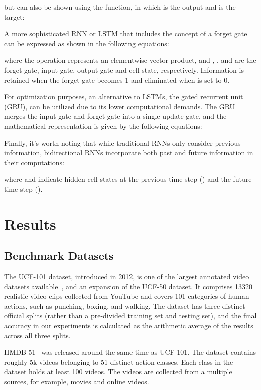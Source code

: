 \documentclass[fleqn,10pt]{wlscirep}
\begin{document}
but can also be shown using the  function, in which  is the output and  is the target:

A more sophisticated RNN or LSTM that includes the concept of a forget gate can be expressed as shown in the following equations:

where the  operation represents an elementwise vector product, and , ,  and  are the forget gate, input gate, output gate and cell state, respectively. Information is retained when the forget gate  becomes 1 and eliminated when  is set to 0.

For optimization purposes, an alternative to LSTMs, the gated recurrent unit (GRU), can be utilized due to its lower computational demands. The GRU merges the input gate and forget gate into a single update gate, and the mathematical representation is given by the following equations:


Finally, it's worth noting that while traditional RNNs only consider previous information, bidirectional RNNs incorporate both past and future information in their computations:

where  and  indicate hidden cell states at the previous time step () and the future time step ().
\section{Results}
\label{sec:results}
\subsection{Benchmark Datasets}
\label{sec:dataset}



The UCF-101 dataset, introduced in 2012, is one of the largest annotated video datasets available~\cite{soomro2012ucf101}, and an expansion of the UCF-50 dataset. It comprises 13320 realistic video clips collected from YouTube and covers 101 categories of human actions, such as punching, boxing, and walking. The dataset has three distinct official splits (rather than a pre-divided training set and testing set), and the final accuracy in our experiments is calculated as the arithmetic average of the results across all three splits. 

HMDB-51~\cite{kuehne2011hmdb} was released around the same time as UCF-101. The dataset contains roughly 5k videos belonging to 51 distinct action classes. Each class in the dataset holds at least 100 videos. The videos are collected from a multiple sources, for example, movies and online videos.
\end{document}

